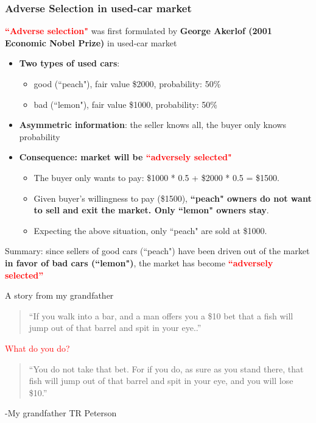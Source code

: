 \documentclass[aspectratio=169]{beamer}
\begin{document}
\begin{frame}
\frametitle{Adverse Selection in used-car market}


\textbf{\textcolor{red}{``Adverse selection"}} was first formulated by \textbf{George Akerlof (2001 Economic Nobel Prize)} in used-car market
\begin{itemize}
    \item \textbf{Two types of used cars}: 
    \begin{itemize}
        \item good (``peach"), fair value \$2000, probability: 50\%
        \item bad (``lemon"), fair value \$1000, probability: 50\%
    \end{itemize}
    \item \textbf{Asymmetric information}: the seller knows all, the buyer only knows probability  \pause 
    \item \textbf{Consequence: market will be \textcolor{red}{``adversely selected"}}
    \begin{itemize}
        \item The buyer only wants to pay: \$1000 * 0.5 + \$2000 * 0.5 = \$1500.  \pause 
        \item Given buyer's willingness to pay (\$1500), \textbf{``peach" owners do not want to sell and exit the market. Only ``lemon" owners stay}.  \pause 
        \item Expecting the above situation, only ``peach" are sold at \$1000. 
    \end{itemize}
\end{itemize}

\medskip 

Summary: since sellers of good cars (``peach") have been driven out of the market \textbf{in favor of bad cars (``lemon")}, the market has become \textbf{\textcolor{red}{“adversely selected”}}


\end{frame}




\begin{frame}{A story from my grandfather}

\begin{quote}
    ``If you walk into a bar, and a man offers you a \$10 bet that a fish will jump out of that barrel and spit in your eye..''
\end{quote} 

\textcolor{red}{What do you do?}  \pause 

\begin{quote}
    ``You do not take that bet. For if you do, as sure as you stand there, that fish will jump out of that barrel and spit in your eye, and you will lose \$10.''
\end{quote} 

-My grandfather TR Peterson 
    
\end{frame}
\end{document}
